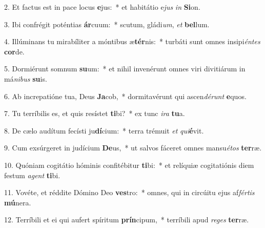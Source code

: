 ﻿2. Et factus est in pace locus \textbf{e}jus:~* et habitátio e\textit{jus} \textit{in} \textbf{Si}on.

3. Ibi confrégit poténtias \textbf{ár}cuum:~* scutum, gládi\textit{um}, \textit{et} \textbf{bel}lum.

4. Illúminans tu mirabíliter a móntibus æ\textbf{tér}nis:~* turbáti sunt omnes insipi\textit{én}\textit{tes} \textbf{cor}de.

5. Dormiérunt somnum \textbf{su}um:~* et nihil invenérunt omnes viri divitiárum in má\textit{ni}\textit{bus} \textbf{su}is.

6. Ab increpatióne tua, Deus \textbf{Ja}cob,~* dormitavérunt qui ascen\textit{dé}\textit{runt} \textbf{e}quos.

7. Tu terríbilis es, et quis resístet \textbf{ti}bi?~* ex tunc \textit{i}\textit{ra} \textbf{tu}a.

8. De cælo audítum fecísti ju\textbf{dí}cium:~* terra trémuit \textit{et} \textit{qui}\textbf{é}vit.

9. Cum exsúrgeret in judícium \textbf{De}us,~* ut salvos fáceret omnes mansu\textit{é}\textit{tos} \textbf{ter}ræ.

10. Quóniam cogitátio hóminis confitébitur \textbf{ti}bi:~* et relíquiæ cogitatiónis diem festum \textit{a}\textit{gent} \textbf{ti}bi.

11. Vovéte, et réddite Dómino Deo \textbf{ves}tro:~* omnes, qui in circúitu ejus af\textit{fér}\textit{tis} \textbf{mú}nera.

12. Terríbili et ei qui aufert spíritum \textbf{prín}cipum,~* terríbili apud \textit{re}\textit{ges} \textbf{ter}ræ.